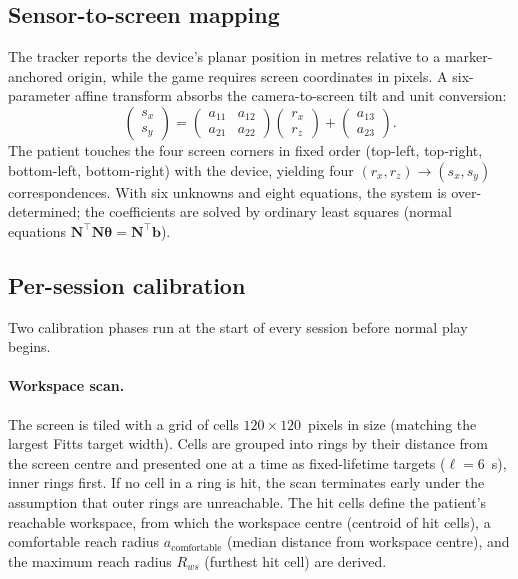 \documentclass[11pt,a4paper]{article}
\begin{document}
\subsection{Sensor-to-screen mapping}

The tracker reports the device's planar position in metres relative to a marker-anchored origin, while the game requires screen coordinates in pixels. A six-parameter affine transform absorbs the camera-to-screen tilt and unit conversion:
\begin{equation}
    \begin{pmatrix} s_x \\ s_y \end{pmatrix}
    =
    \begin{pmatrix} a_{11} & a_{12} \\ a_{21} & a_{22} \end{pmatrix}
    \begin{pmatrix} r_x \\ r_z \end{pmatrix}
    +
    \begin{pmatrix} a_{13} \\ a_{23} \end{pmatrix}.
\end{equation}
The patient touches the four screen corners in fixed order (top-left, top-right, bottom-left, bottom-right) with the device, yielding four $(r_x, r_z) \to (s_x, s_y)$ correspondences. With six unknowns and eight equations, the system is over-determined; the coefficients are solved by ordinary least squares (normal equations $\mathbf{N}^\top \mathbf{N} \boldsymbol{\theta} = \mathbf{N}^\top \mathbf{b}$).

\subsection{Per-session calibration}

Two calibration phases run at the start of every session before normal play begins.

\paragraph{Workspace scan.}
The screen is tiled with a grid of cells $120 \times 120$~pixels in size (matching the largest Fitts target width). Cells are grouped into rings by their distance from the screen centre and presented one at a time as fixed-lifetime targets ($\ell = 6$~s), inner rings first. If no cell in a ring is hit, the scan terminates early under the assumption that outer rings are unreachable. The hit cells define the patient's reachable workspace, from which the workspace centre (centroid of hit cells), a comfortable reach radius $a_{\text{comfortable}}$ (median distance from workspace centre), and the maximum reach radius $R_{ws}$ (furthest hit cell) are derived.
\end{document}
